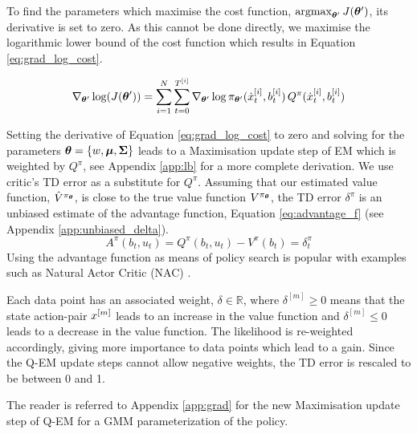 To find the parameters which maximise the cost function, $\argmax_{\Param'} J(\Param')$, its derivative is set to zero. 
As this cannot be done directly, we maximise the logarithmic lower bound of the cost function which results in 
Equation \ref{eq:grad_log_cost}.

\begin{equation} \label{eq:grad_log_cost}
    \nabla_{\boldsymbol{\theta}'}\log(J(\boldsymbol{\theta}')) = \sum\limits_{i=1}^{N} \sum\limits_{t=0}^{T^{[i]}} \nabla_{\boldsymbol{\theta}'}\log \pi_{\boldsymbol{\theta}'}(\dot{x}^{[i]}_t,b^{[i]}_t) \, Q^{\pi}(\dot{x}^{[i]}_t,b^{[i]}_t)
\end{equation}

Setting the derivative of Equation \ref{eq:grad_log_cost} to zero and solving for the parameters
$\boldsymbol{\theta}=\{w,\boldsymbol{\mu},\boldsymbol{\Sigma}\}$ leads to a Maximisation update step of EM
which is weighted by $Q^{\pi}$, see Appendix \ref{app:lb} for a more complete derivation.
We use critic's TD error as a substitute for $Q^{\pi}$. Assuming that our estimated value function, $\hat{V}^{\pi_{\boldsymbol{\theta}}}$, 
is close to the true value function $V^{\pi_{\boldsymbol{\theta}}}$, the TD error $\delta^{\pi}$ is an unbiased estimate of the advantage function, Equation \ref{eq:advantage_f} 
(see Appendix \ref{app:unbiased_delta}).
\begin{equation}\label{eq:advantage_f}
 A^{\pi}(b_t,u_t) = Q^{\pi}(b_t,u_t) - V^{\pi}(b_t) = \delta^{\pi}_t
\end{equation}
Using the advantage function as means of policy search is popular with examples such as
Natural Actor Critic (NAC) \cite{peter_nac_2008}.

Each data point has an associated weight, $\delta \in \mathbb{R}$, where $\delta^{[m]} \geq 0$ means that the 
state action-pair $x^{[m]}$ leads to an increase in the value function and $\delta^{[m]} \leq 0$ leads to 
a decrease in the value function. The likelihood is re-weighted accordingly, giving more importance to data points which lead to a gain. Since 
the Q-EM update steps cannot allow negative weights, the TD error is rescaled to be between 0 and 1. %

The reader is referred to Appendix \ref{app:grad} for the new Maximisation update step of Q-EM for a 
GMM parameterization of the policy.

